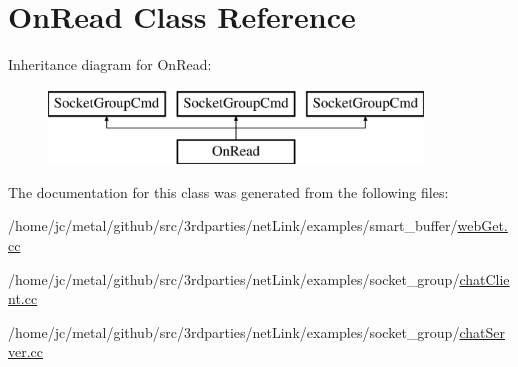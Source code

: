 \hypertarget{classOnRead}{}\section{On\+Read Class Reference}
\label{classOnRead}
Inheritance diagram for On\+Read\+:\begin{figure}[H]
\begin{center}
\leavevmode
\includegraphics[height=2.000000cm]{classOnRead}
\end{center}
\end{figure}


The documentation for this class was generated from the following files\+:\begin{DoxyCompactItemize}
\item 
/home/jc/metal/github/src/3rdparties/net\+Link/examples/smart\+\_\+buffer/\hyperlink{webGet_8cc}{web\+Get.\+cc}\item 
/home/jc/metal/github/src/3rdparties/net\+Link/examples/socket\+\_\+group/\hyperlink{chatClient_8cc}{chat\+Client.\+cc}\item 
/home/jc/metal/github/src/3rdparties/net\+Link/examples/socket\+\_\+group/\hyperlink{chatServer_8cc}{chat\+Server.\+cc}\end{DoxyCompactItemize}

